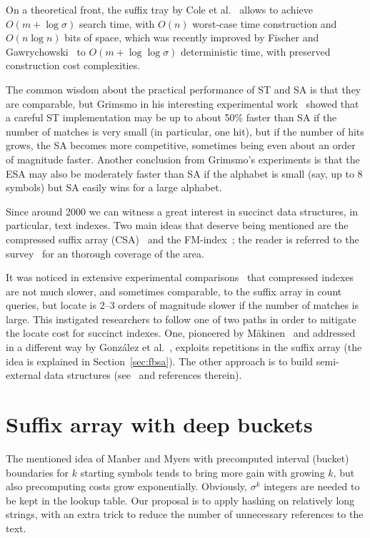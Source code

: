 \documentclass{cai}
\begin{document}
On a theoretical front, the suffix tray by Cole et al.~\cite{cole2006suffix} 
allows to achieve $O(m + \log\sigma)$ search time, with $O(n)$ worst-case 
time construction and $O(n\log n)$ bits of space, which was recently improved 
by Fischer and Gawrychowski~\cite{FG15} 
to $O(m + \log\log\sigma)$ deterministic time, with preserved construction 
cost complexities.

The common wisdom about the practical performance of ST and SA 
is that they are comparable, but Grimsmo in his interesting experimental 
work~\cite{Gri07} showed that a careful ST implementation 
may be up to about 50\% faster than SA if the number of matches is very small 
(in particular, one hit), but if the number of hits grows, the SA becomes 
more competitive, sometimes being even about an order of magnitude faster.
Another conclusion from Grimsmo's experiments is that the ESA may also be 
moderately faster than SA if the alphabet is small (say, up to 8 symbols) 
but SA easily wins for a large alphabet.

Since around 2000 we can witness a great interest in succinct data structures, 
in particular, text indexes.
Two main ideas that deserve being mentioned are 
the compressed suffix array (CSA)~\cite{GV00,DBLP:conf/soda/Sadakane02} 
and the FM-index~\cite{FM00}; the reader is referred to the survey~\cite{NMacmcs06} 
for an 
thorough
coverage of the area.

It was noticed in extensive experimental comparisons~\cite{FGNVjea08,GP14} 
that compressed indexes are not much slower, and sometimes comparable, 
to the suffix array in count queries, but locate is 2--3 orders of magnitude 
slower if the number of matches is large.
This instigated researchers to follow one of two paths in order to 
mitigate the locate cost for succinct indexes.
One, pioneered by M{\"a}kinen~\cite{DBLP:conf/cpm/Makinen00,DBLP:journals/fuin/Makinen03} 
and addressed in a different way by Gonz{\'a}lez et al.~\cite{DBLP:conf/cpm/GonzalezN07,GNFjea14},
exploits repetitions in the suffix array (the idea is explained in Section~\ref{sec:fbsa}).
The other approach is to build semi-external data structures 
(see~\cite{GM13,GMCTW14} and references therein).


\section{Suffix array with deep buckets}

The mentioned idea of Manber and Myers with precomputed interval (bucket) 
boundaries for $k$ starting symbols tends to bring more gain with growing $k$, 
but also precomputing costs grow exponentially. 
Obviously, $\sigma^k$ integers are needed to be kept in the lookup table.
Our proposal is to apply hashing on relatively long strings, with an extra trick 
to reduce the number of 
unnecessary references to the text.
\end{document}
